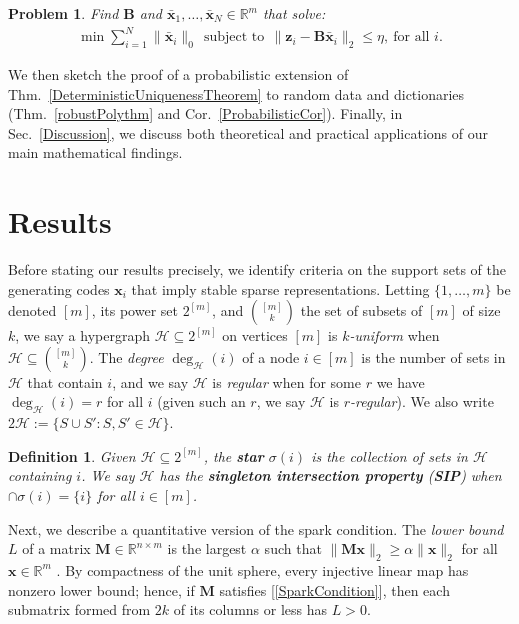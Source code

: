 \documentclass[9pt,twocolumn]{pnas-new}
\newtheorem{problem}{Problem}
\newtheorem{definition}{Definition}
\renewcommand{\eqref}[1]{\textnormal{[\ref{#1}]}}
\begin{document}
\begin{problem}\label{OptimizationProblem}
Find $\mathbf{B}$ and \mbox{$\mathbf{\bar x}_1, \ldots, \mathbf{\bar x}_N \in \mathbb{R}^m$} that solve:
\begin{align}\label{minsum}
\min \sum_{i = 1}^N \|\mathbf{\bar x}_i\|_0 \ \ 
\text{subject to} \ \ \|\mathbf{z}_i - \mathbf{B}\mathbf{\bar x}_i\|_2 \leq \eta, \ \text{for all $i$}.
\end{align}
\end{problem}
We then sketch the proof of a probabilistic extension of Thm.~\ref{DeterministicUniquenessTheorem} to random data and dictionaries (Thm.~\ref{robustPolythm} and Cor.~\ref{ProbabilisticCor}). Finally, in Sec.~\ref{Discussion}, we discuss both theoretical and practical applications of our main mathematical findings.

\section{Results}\label{Results}

Before stating our results precisely, we identify criteria on the support sets of the generating codes $\mathbf{x}_i$ that imply stable sparse representations. Letting $\{1, \ldots, m\}$ be denoted $[m]$, its power set $2^{[m]}$, and ${[m] \choose k}$ the set of subsets of $[m]$ of size $k$, we say a hypergraph $\mathcal{H} \subseteq 2^{[m]}$ on vertices $[m]$ is \textit{$k$-uniform} when $\mathcal{H} \subseteq {[m] \choose k}$. The \emph{degree} $\deg_\mathcal{H}(i)$ of a node $i \in [m]$ is the number of sets in $\mathcal{H}$ that contain $i$, and we say $\mathcal{H}$ is \emph{regular} when for some $r$ we have $\deg_\mathcal{H}(i) = r$ for all $i$ (given such an $r$, we say $\mathcal{H}$ is \textit{$r$-regular}). We also write $2\mathcal{H} := \{ S \cup S': S, S' \in \mathcal{H}\}$.

\begin{definition}\label{sip}
Given $\mathcal{H} \subseteq 2^{[m]}$, the \textbf{star} $\sigma(i)$ is the collection of sets in $\mathcal{H}$ containing $i$. We say $\mathcal{H}$ has the \textbf{singleton intersection property} (\textbf{SIP}) when $\cap \sigma(i) = \{i\}$ for all $i \in [m]$.
\end{definition}

Next, we describe a quantitative version of the spark condition. The \emph{lower bound} $L$ of a matrix $\mathbf{M} \in \mathbb R^{n \times m}$ is the largest $\alpha$ such that \mbox{$\|\mathbf{M}\mathbf{x}\|_2 \geq \alpha\|\mathbf{x}\|_2$} for all $\mathbf{x} \in \mathbb{R}^m$ \cite{Grcar10}. By compactness of the unit sphere, every injective linear map has nonzero lower bound; hence, if $\mathbf{M}$ satisfies \eqref{SparkCondition}, then each submatrix formed from $2k$ of its columns or less has $L > 0$. 
\end{document}
